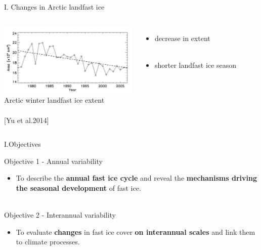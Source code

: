 \documentclass[8pt]{beamer}
\newcommand\Fontvi{\fontsize{6}{7.2}\selectfont}
\begin{document}
\setwatermark{\fontsize{125pt}{125pt}\selectfont{}}
\begin{frame}[fragile]{I. Changes in Arctic landfast ice}
	\begin{columns}
		\includegraphics[height=3.5cm]{./img/Extent_timeseries.png}\\
		Arctic winter landfast ice extent \\~\\
		\Fontvi
		[Yu et al.2014]
		\column{0.1\textwidth}
		\column{0.4\textwidth}
			\begin{itemize}
				\item decrease in extent\\~\\
				\item shorter landfast ice season
			\end{itemize}
	\end{columns}
\end{frame}

\setwatermark{\fontsize{125pt}{125pt}\selectfont{}}
\begin{frame}[fragile]{I.Objectives}
	
		
	Objective 1 -  Annual variability
		\begin{itemize}
			\item To describe the \textbf{annual fast ice cycle} and 
		reveal the \textbf{mechanisms driving the seasonal development} of fast ice.\\~\\
		\end{itemize}
	Objective 2 - Interannual variability
		\begin{itemize}
			\item To evaluate \textbf{changes} in fast ice cover \textbf{on interannual scales} and 
		link them to climate processes.
		\end{itemize}

\end{frame}
\end{document}
